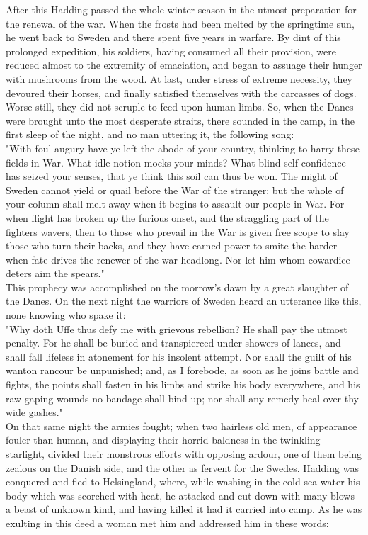 \documentclass[10pt,a4paper]{report}
\begin{document}
After this Hadding passed the whole winter season in the utmost preparation for the renewal of the war. When the frosts had been melted by the springtime sun, he went back to Sweden and there spent five years in warfare. By dint of this prolonged expedition, his soldiers, having consumed all their provision, were reduced almost to the extremity of emaciation, and began to assuage their hunger with mushrooms from the wood. At last, under stress of extreme necessity, they devoured their horses, and finally satisfied themselves with the carcasses of dogs. Worse still, they did not scruple to feed upon human limbs. So, when the Danes were brought unto the most desperate straits, there sounded in the camp, in the first sleep of the night, and no man uttering it, the following song:\\

"With foul augury have ye left the abode of your country, thinking to harry these fields in War. What idle notion mocks your minds? What blind self-confidence has seized your senses, that ye think this soil can thus be won. The might of Sweden cannot yield or quail before the War of the stranger; but the whole of your column shall melt away when it begins to assault our people in War. For when flight has broken up the furious onset, and the straggling part of the fighters wavers, then to those who prevail in the War is given free scope to slay those who turn their backs, and they have earned power to smite the harder when fate drives the renewer of the war headlong. Nor let him whom cowardice deters aim the spears."\\

This prophecy was accomplished on the morrow's dawn by a great slaughter of the Danes. On the next night the warriors of Sweden heard an utterance like this, none knowing who spake it:\\

"Why doth Uffe thus defy me with grievous rebellion? He shall pay the utmost penalty. For he shall be buried and transpierced under showers of lances, and shall fall lifeless in atonement for his insolent attempt. Nor shall the guilt of his wanton rancour be unpunished; and, as I forebode, as soon as he joins battle and fights, the points shall fasten in his limbs and strike his body everywhere, and his raw gaping wounds no bandage shall bind up; nor shall any remedy heal over thy wide gashes."\\

On that same night the armies fought; when two hairless old men, of appearance fouler than human, and displaying their horrid baldness in the twinkling starlight, divided their monstrous efforts with opposing ardour, one of them being zealous on the Danish side, and the other as fervent for the Swedes. Hadding was conquered and fled to Helsingland, where, while washing in the cold sea-water his body which was scorched with heat, he attacked and cut down with many blows a beast of unknown kind, and having killed it had it carried into camp. As he was exulting in this deed a woman met him and addressed him in these words:\\
\end{document}

